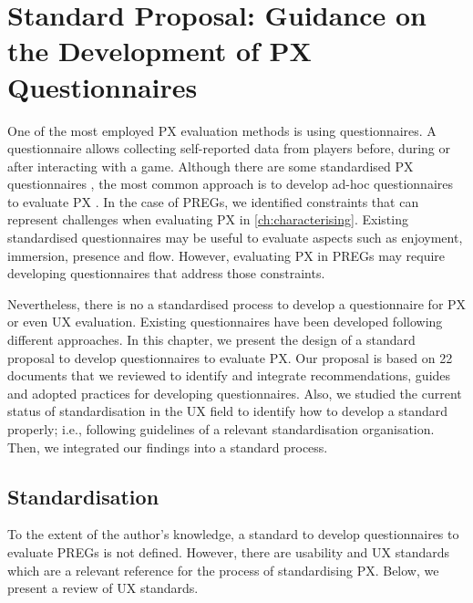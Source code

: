 \chapter{Standard Proposal: Guidance on the Development of PX Questionnaires}
\label{ch:questionnaire}

% 
One of the most employed \ac{PX} evaluation methods is using questionnaires. A questionnaire allows collecting self-reported data from players before, during or after interacting with a game. Although there are some standardised \ac{PX} questionnaires \autocite{denisova_convergence_2016,VandenAbeele2016,Calvillo-Gamez2015,Brockmyer2009,Poels2008,DeKort2007,Vorderer2004}, the most common approach is to develop ad-hoc questionnaires to evaluate \ac{PX} \autocite{Yanez-Gomez2017}. In the case of \acp{PREG}, we identified constraints that can represent challenges when evaluating \ac{PX} in \autoref{ch:characterising}. Existing standardised questionnaires may be useful to evaluate aspects such as enjoyment, immersion, presence and flow. However, evaluating \ac{PX} in \acp{PREG} may require developing questionnaires that address those constraints.

Nevertheless, there is no a standardised process to develop a questionnaire for \ac{PX} or even \ac{UX} evaluation. Existing questionnaires have been developed following different approaches. In this chapter, we present the design of a standard proposal to develop questionnaires to evaluate \ac{PX}. Our proposal is based on 22 documents that we reviewed to identify and integrate recommendations, guides and adopted practices for developing questionnaires. Also, we studied the current status of standardisation in the \ac{UX} field to identify how to develop a standard properly; i.e., following guidelines of a relevant standardisation organisation. Then, we integrated our findings into a standard process.

\section{Standardisation} %
\label{sec:standardisation}
To the extent of the author's knowledge, a standard to develop questionnaires to evaluate \acp{PREG} is not defined. However, there are usability and \ac{UX} standards which are a relevant reference for the process of standardising \ac{PX}. Below, we present a review of \ac{UX} standards.

